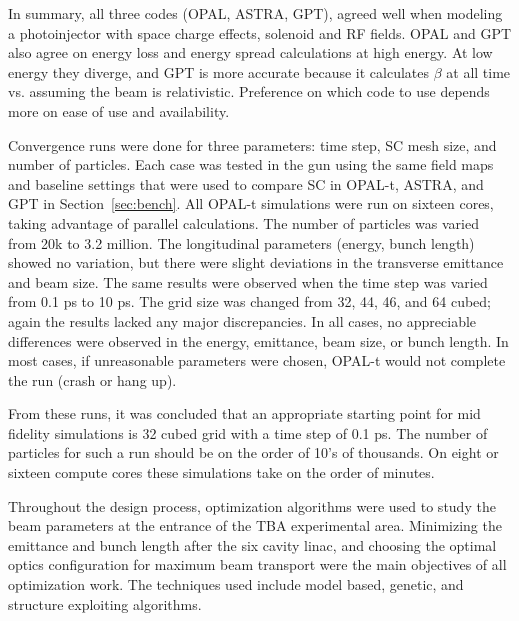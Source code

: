 In summary, all three codes (OPAL, ASTRA, GPT), agreed well when modeling a photoinjector
with space charge effects, solenoid and RF fields.
OPAL and GPT also agree on energy loss and energy spread calculations at high energy.
At low energy they diverge, and GPT is more accurate because it calculates 
$\beta$ at all time vs. assuming the beam is relativistic.
Preference on which code to use depends more on ease of use 
and availability. 


Convergence runs were done for three parameters: 
time step, SC mesh size, and number of particles.  
Each case was tested in the gun using the same field maps and 
baseline settings that were used to compare SC in OPAL-t,  
ASTRA, and GPT in Section~\ref{sec:bench}. 
All OPAL-t simulations were run on 
sixteen cores, taking advantage of parallel calculations. 
The number of particles was varied from 20k to 3.2 million.  
The longitudinal parameters (energy,  bunch length)  
showed no variation, but there were slight deviations 
in the transverse emittance and beam size. The same results 
were observed when the time step was varied from 0.1 ps  to  10  ps.  
The grid size was changed from 32, 44, 46, and 64 cubed; 
again the results lacked any major discrepancies.  
In all cases, no appreciable differences were observed in the energy,
emittance, beam size, or bunch length. In  most  cases,  
if unreasonable  parameters  were chosen, 
OPAL-t would not complete the run (crash or hang up).  

From these runs, it was concluded that an appropriate starting point 
for mid fidelity simulations is 32 cubed grid with a time step
of 0.1 ps. The number of particles for such a run should be on the
order of 10's of thousands. On eight or sixteen compute cores
these simulations take on the order of minutes.

 
 \label{sec:opt}

Throughout the design process, optimization algorithms 
were used to study the beam parameters at the entrance of the TBA experimental area.
Minimizing the emittance and bunch length after the six cavity linac,
and choosing the optimal optics configuration for maximum beam transport 
were the main objectives of all optimization work.
The techniques used include model based, genetic,
and structure exploiting algorithms. 
 

